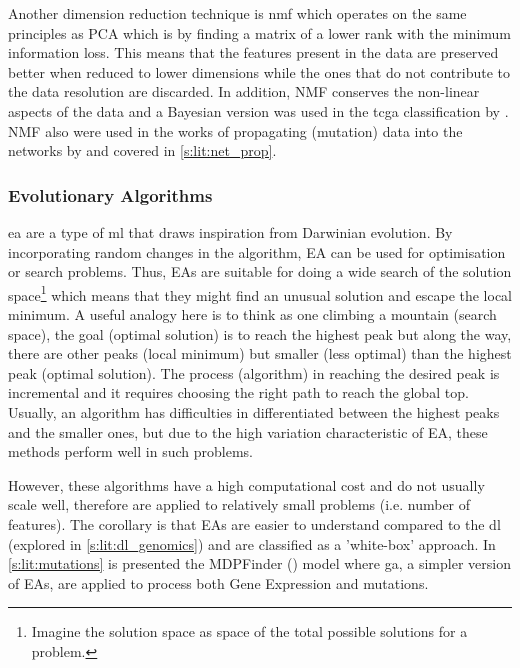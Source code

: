 Another dimension reduction technique is \acrfull{nmf} which operates on the same principles as PCA which is by finding a matrix of a lower rank with the minimum information loss. This means that the features present in the data are preserved better when reduced to lower dimensions while the ones that do not contribute to the data resolution are discarded. In addition, NMF conserves the non-linear aspects of the data and a Bayesian version was used in the \acrfull{tcga} classification by \citet{Robertson2017-mg}. NMF also were used in the works of propagating (mutation) data into the networks by \citet{Yang2016-dm, Cai2008-fv} and covered in \cref{s:lit:net_prop}.



\subsubsection{Evolutionary Algorithms} \label{s:lit:ea_overview}


\acrlong{ea} are a type of \acrshort{ml} that draws inspiration from Darwinian evolution. By incorporating random changes in the algorithm, EA can be used for optimisation or search problems. Thus, EAs are suitable for doing a wide search of the solution space\footnote{Imagine the solution space as space of the total possible solutions for a problem.} which means that they might find an unusual solution and escape the local minimum. A useful analogy here is to think as one climbing a mountain (search space), the goal (optimal solution) is to reach the highest peak but along the way, there are other peaks (local minimum) but smaller (less optimal) than the highest peak (optimal solution). The process (algorithm) in reaching the desired peak is incremental and it requires choosing the right path to reach the global top. Usually, an algorithm has difficulties in differentiated between the highest peaks and the smaller ones, but due to the high variation characteristic of EA, these methods perform well in such problems.


However, these algorithms have a high computational cost and do not usually scale well, therefore are applied to relatively small problems (i.e. number of features). The corollary is that EAs are easier to understand compared to the  \acrfull{dl} (explored in \cref{s:lit:dl_genomics}) and are classified as a 'white-box' approach. In \cref{s:lit:mutations} is presented the MDPFinder (\citet{Zhao2012-wj}) model where \acrfull{ga}, a simpler version of EAs, are applied to process both Gene Expression and mutations.

